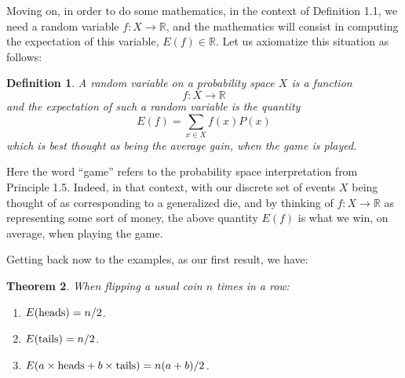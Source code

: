 \documentclass[12pt]{amsbook}
\newtheorem{theorem}{Theorem}[chapter]
\newtheorem{definition}[theorem]{Definition}
\begin{document}
Moving on, in order to do some mathematics, in the context of Definition 1.1, we need a random variable $f:X\to\mathbb R$, and the mathematics will consist in computing the expectation of this variable, $E(f)\in\mathbb R$. Let us axiomatize this situation as follows:


\begin{definition}
A random variable on a probability space $X$ is a function
$$f:X\to\mathbb R$$
and the expectation of such a random variable is the quantity
$$E(f)=\sum_{x\in X}f(x)P(x)$$
which is best thought as being the average gain, when the game is played.
\end{definition}

Here the word ``game'' refers to the probability space interpretation from Principle 1.5. Indeed, in that context, with our discrete set of events $X$ being thought of as corresponding to a generalized die, and by thinking of $f:X\to\mathbb R$ as representing some sort of money, the above quantity $E(f)$ is what we win, on average, when playing the game.

\bigskip

Getting back now to the examples, as our first result, we have:

\begin{theorem}
When flipping a usual coin $n$ times in a row:
\begin{enumerate}
\item $E({\rm heads})=n/2$.

\item $E({\rm tails})=n/2$.

\item $E(a\times{\rm heads}+b\times{\rm tails})=n(a+b)/2$.
\end{enumerate} 
\end{theorem}
\end{document}
